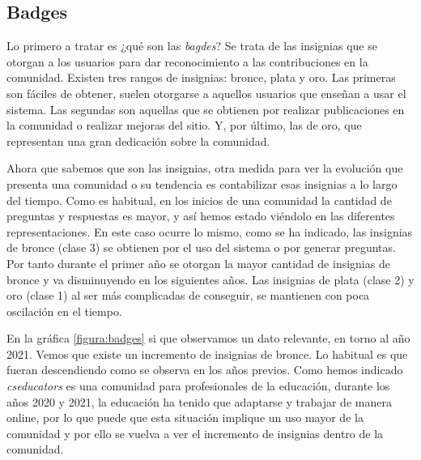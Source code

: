 \documentclass[a4paper, 12pt]{book}
\begin{document}


%
%



\subsection{Badges}

Lo primero a tratar es ¿qué son las \emph{bagdes}? Se trata de las insignias que se otorgan a los usuarios para dar reconocimiento a las contribuciones en la comunidad. 
Existen tres rangos de insignias: bronce, plata y oro. Las primeras son fáciles de obtener, suelen otorgarse a aquellos usuarios que enseñan a usar el sistema. Las segundas son aquellas que se obtienen por realizar publicaciones en la comunidad o realizar mejoras del sitio. Y, por último, las de oro, que representan una gran dedicación sobre la comunidad. 

Ahora que sabemos que son las insignias, otra medida para ver la evolución que presenta una comunidad o su tendencia es contabilizar esas insignias a lo largo del tiempo. Como es habitual, en los inicios de una comunidad la cantidad de preguntas y respuestas es mayor, y así hemos estado viéndolo en las diferentes representaciones. En este caso ocurre lo mismo, como se ha indicado, las insignias de bronce (clase 3) se obtienen por el uso del sistema o por generar preguntas. Por tanto durante el primer año se otorgan la mayor cantidad de insignias de bronce y va disminuyendo en los siguientes años. Las insignias de plata (clase 2) y oro (clase 1) al ser más complicadas de conseguir, se mantienen con poca oscilación en el tiempo. 

En la gráfica \ref{figura:badges} si que observamos un dato relevante, en torno al año 2021. Vemos que existe un incremento de insignias de bronce. Lo habitual es que fueran descendiendo como se observa en los años previos. Como hemos indicado \emph{cseducators} es una comunidad para profesionales de la educación, durante los años 2020 y 2021, la educación ha tenido que adaptarse y trabajar de manera online, por lo que puede que esta situación implique un uso mayor de la comunidad y por ello se vuelva a ver el incremento de insignias dentro de la comunidad.
\end{document}
